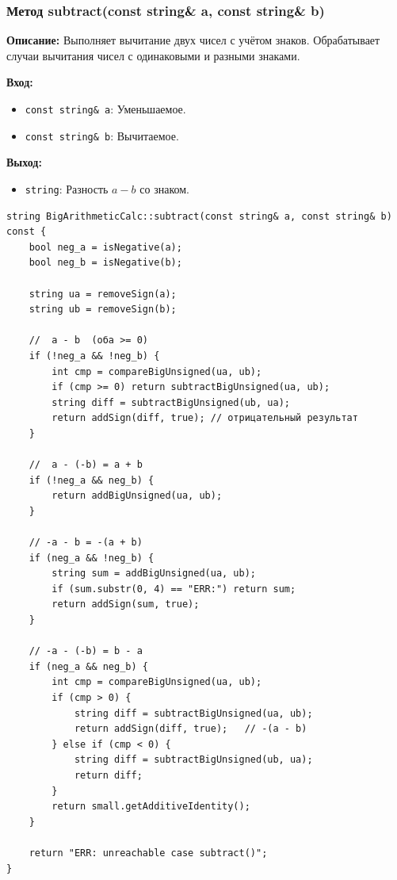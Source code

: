 

\subsubsection{Метод subtract(const string\& a, const string\& b)}

\textbf{Описание:} Выполняет вычитание двух чисел с учётом знаков. Обрабатывает случаи вычитания чисел с одинаковыми и разными знаками.

\textbf{Вход:}
\begin{itemize}
    \item \texttt{const string\& a}: Уменьшаемое.
    \item \texttt{const string\& b}: Вычитаемое.
\end{itemize}

\textbf{Выход:}
\begin{itemize}
    \item \texttt{string}: Разность $a - b$ со знаком.
\end{itemize}

\begin{lstlisting}[style=cstyle, caption={Реализация subtract()}]
string BigArithmeticCalc::subtract(const string& a, const string& b) const {
    bool neg_a = isNegative(a);
    bool neg_b = isNegative(b);

    string ua = removeSign(a);
    string ub = removeSign(b);

    //  a - b  (оба >= 0)
    if (!neg_a && !neg_b) {
        int cmp = compareBigUnsigned(ua, ub);
        if (cmp >= 0) return subtractBigUnsigned(ua, ub);
        string diff = subtractBigUnsigned(ub, ua);
        return addSign(diff, true); // отрицательный результат
    }

    //  a - (-b) = a + b
    if (!neg_a && neg_b) {
        return addBigUnsigned(ua, ub);
    }

    // -a - b = -(a + b)
    if (neg_a && !neg_b) {
        string sum = addBigUnsigned(ua, ub);
        if (sum.substr(0, 4) == "ERR:") return sum;
        return addSign(sum, true);
    }

    // -a - (-b) = b - a
    if (neg_a && neg_b) {
        int cmp = compareBigUnsigned(ua, ub);
        if (cmp > 0) {
            string diff = subtractBigUnsigned(ua, ub);
            return addSign(diff, true);   // -(a - b)
        } else if (cmp < 0) {
            string diff = subtractBigUnsigned(ub, ua);
            return diff;
        }
        return small.getAdditiveIdentity();
    }

    return "ERR: unreachable case subtract()";
}

\end{lstlisting}

